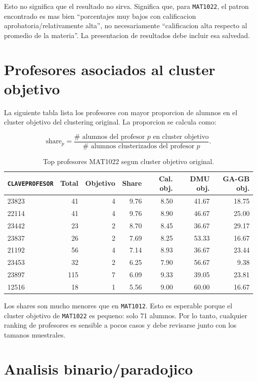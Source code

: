 \documentclass[11pt,letterpaper]{article}
\newcommand{\code}[1]{\texttt{#1}}
\begin{document}
Esto no significa que el resultado no sirva. Significa que, para \code{MAT1022}, el patron encontrado es mas bien ``porcentajes muy bajos con calificacion aprobatoria/relativamente alta'', no necesariamente ``calificacion alta respecto al promedio de la materia''. La presentacion de resultados debe incluir esa salvedad.

\section{Profesores asociados al cluster objetivo}

La siguiente tabla lista los profesores con mayor proporcion de alumnos en el cluster objetivo del clustering original. La proporcion se calcula como:

\[
\text{share}_{p} =
\frac{\#\text{ alumnos del profesor }p\text{ en cluster objetivo}}
{\#\text{ alumnos clusterizados del profesor }p}.
\]

\begin{table}[H]
\centering
\caption{Top profesores MAT1022 segun cluster objetivo original.}
\begin{tabular}{lrrrrrr}
\toprule
\code{CLAVEPROFESOR} & Total & Objetivo & Share & Cal. obj. & DMU obj. & GA-GB obj. \\
\midrule
23823 & 41 & 4 & 9.76 & 8.50 & 41.67 & 18.75 \\
22114 & 41 & 4 & 9.76 & 8.90 & 46.67 & 25.00 \\
23442 & 23 & 2 & 8.70 & 8.45 & 36.67 & 29.17 \\
23837 & 26 & 2 & 7.69 & 8.25 & 53.33 & 16.67 \\
21192 & 56 & 4 & 7.14 & 8.93 & 36.67 & 23.44 \\
23453 & 32 & 2 & 6.25 & 7.90 & 56.67 & 9.38 \\
23897 & 115 & 7 & 6.09 & 9.33 & 39.05 & 23.81 \\
12516 & 18 & 1 & 5.56 & 9.00 & 60.00 & 16.67 \\
\bottomrule
\end{tabular}
\end{table}

Los shares son mucho menores que en \code{MAT1012}. Esto es esperable porque el cluster objetivo de \code{MAT1022} es pequeno: solo 71 alumnos. Por lo tanto, cualquier ranking de profesores es sensible a pocos casos y debe revisarse junto con los tamanos muestrales.

\section{Analisis binario/paradojico}
\end{document}
